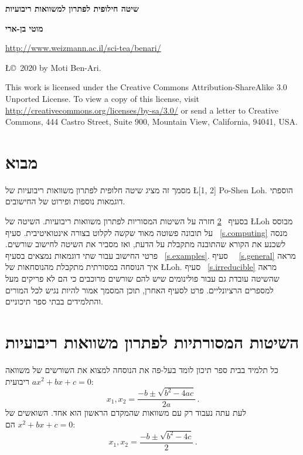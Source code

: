 \documentclass[12pt,a4paper]{article}
\begin{document}
\thispagestyle{empty}


\begin{center}
\textbf{\LARGE שיטה חילופית לפתרון למשוואות ריבועיות}

\bigskip
\bigskip

\textbf{\Large מוטי בן-ארי}

\bigskip

\url{http://www.weizmann.ac.il/sci-tea/benari/}

\bigskip

\L{\copyright{}\  2020 by Moti Ben-Ari.}
\end{center}

\begin{footnotesize}
This work is licensed under the Creative Commons Attribution-ShareAlike 3.0 Unported License. To view a copy of this license, visit \url{http://creativecommons.org/licenses/by-sa/3.0/} or send a letter to Creative Commons, 444 Castro Street, Suite 900, Mountain View, California, 94041, USA.
\end{footnotesize}


\section{מבוא}

מסמך זה מציג שיטה חלופית לפתרון משוואות ריבועיות של 
\L{[1, 2] Po-Shen Loh}.
הוספתי דוגמאות נוספות ופירוט של החישובים.

בסעיף~%
\ref{s.traditional}
חזרה על השיטות המסוריות לפתרון משוואות ריבועיות. השיטה של 
\L{Loh}
מבוסס על תובונה פשוטה מאוד שקשה לקלוט בצורה אינטואיטיבית. סעיף~%
\ref{s.computing}
מנסה לשכנע את הקורא שהתובנה מתקבלת על הדעת, ואז מסביר את השיטה לחישוב שורשים. פרטי החישוב עבור שתי דוגמאות נמצאים בסעיף~%
\ref{s.examples}.
סעיף~%
~\ref{s.general}
מראה איך הנוסחה במסורתית מתקבלת מהנוסחאות של
\L{Loh}.
סעיף~%
\ref{s.irreducible}
מראה שהשיטה עובדת גם עבור פולינומים שיש להם שורשים מרוכבים כי הם לא פריקים מעל למספרים הרציונליים. פרט לסעיף האחרן, תוכן המסמך אמור להיות נגיש לכל המורים והתלמידים בבתי ספר תיכוניים.

\section{השיטות המסורתיות לפתרון משוואות ריבועיות}\label{s.traditional}

כל תלמיד בבית ספר תיכון לומד בעל-פה את הנוסחה למצוא את השורשים של משוואה ריבועית
$ax^2+bx+c=0$:
\[
x_1, x_2 = \frac{-b\pm\sqrt{b^2-4ac}}{2a}\,.
\]
לעת עתה נעבוד רק עם משוואות שהמקדם הראשון הוא אחד. השואשים של
$x^2+bx+c=0$
הם:
\[
x_1, x_2 = \frac{-b\pm\sqrt{b^2-4c}}{2}\,.
\]
\end{document}
